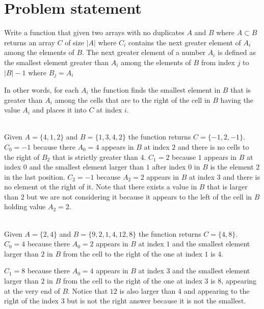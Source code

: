 \section{Problem statement}
\begin{exercise}
\label{example:next_greater_element:exercice1}
Write a function that given two arrays with no duplicates $A$ and $B$ where $A \subset B$ returns an
array $C$ of size $|A|$ where $C_i$ contains the next greater element of $A_i$ among the elements of
$B$. The next greater element of a number $A_i$ is defined as the smallest element greater than
$A_i$ among the elements of $B$ from index $j$ to $|B|-1$ where $B_j = A_i$

In other words, for each $A_i$ the function finds the smallest element in $B$ that is greater than
$A_i$ among the cells that are to the right of the cell in $B$ having the value $A_i$ and places it
into $C$ at index $i$.

	\begin{example}
		\label{example:next_greater_element:example1}
		\hfill \\
		Given $A=\{4,1,2\}$ and $B=\{1,3,4,2\}$ the function returns $C=\{-1,2,-1\}$. $C_0 = -1$
		because there $A_0 = 4$ appears in $B$ at index $2$ and there is no cells to the right of
		$B_2$ that is strictly greater than $4$. $C_1 = 2$ because $1$ appears in $B$ at index $0$
		and the smallest element larger than $1$ after index $0$ in $B$ is the element $2$ in the
		last position. $C_2 = -1$ because $A_2 = 2$ appears in $B$ at index $3$ and there is no
		element ot the right of it. Note that there exists a value in $B$ that is larger than $2$
		but we are not considering it because it appears to the left of the cell in $B$ holding
		value $A_2=2$.
		
	\end{example}

	\begin{example}
		\label{example:next_greater_element:example2}
		\hfill \\
		Given $A=\{2,4\}$ and $B=\{9,2,1,4,12,8\}$ the function returns $C=\{4,8\}$. $C_0 = 4$
		because there $A_0 = 2$ appears in $B$ at index $1$ and  the smallest element larger than
		$2$ in $B$ from the cell to the right of the one at index $1$ is $4$.
		
		$C_1 = 8$ because there $A_0 = 4$ appears in $B$ at index $3$ and  the smallest element
		larger than $2$ in $B$ from the cell to the right of the one at index $3$ is $8$, appearing
		at the very end of $B$. Notice that $12$ is also larger than $4$ and appearing to the right
		of the index $3$ but is not the right answer because it is not the smallest.
	\end{example}
\end{exercise}

